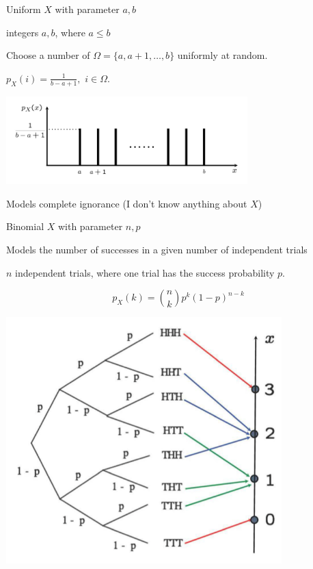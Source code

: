 \documentclass[fleqn,aspectratio=169]{beamer}
\begin{document}
\begin{frame}{Uniform $X$ with parameter $a,b$}

\plitemsep 0.1in

\bci 
\item integers $a,b$, where $a \le b$

\item<2-> Choose a number of $\Omega = \{ a, a+1, \ldots, b \}$ uniformly at random. 

\item<3-> $p_X(i) = \frac{1}{b-a+1},$ $i \in \Omega.$


\centering
\includegraphics[width=0.7\textwidth]{L3_uniform_ex.png}

\item<4-> Models complete ignorance (I don't know anything about $X$)

\eci 

\end{frame}

\begin{frame}{Binomial $X$ with parameter $n,p$}

{
\plitemsep 0.1in
\bci 
\item<2-> Models the number of successes in a given number of independent trials
\item<3-> $n$ independent trials, where one trial has the success probability $p.$

$$
p_X(k) = {n \choose k} p^k (1-p)^{n-k}
$$
\eci 
}
{
\centering
\includegraphics[width=0.8\textwidth]{L3_binomial_ex.png}
}
\end{frame}
\end{document}
